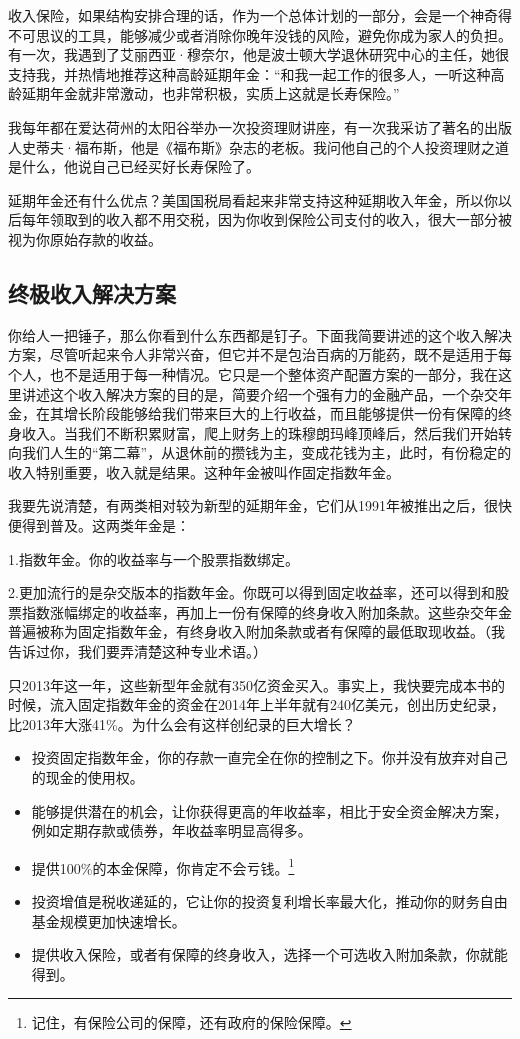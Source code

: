 收入保险，如果结构安排合理的话，作为一个总体计划的一部分，会是一个神奇得不可思议的工具，能够减少或者消除你晚年没钱的风险，避免你成为家人的负担。有一次，我遇到了艾丽西亚·穆奈尔，他是波士顿大学退休研究中心的主任，她很支持我，并热情地推荐这种高龄延期年金：“和我一起工作的很多人，一听这种高龄延期年金就非常激动，也非常积极，实质上这就是长寿保险。”

我每年都在爱达荷州的太阳谷举办一次投资理财讲座，有一次我采访了著名的出版人史蒂夫·福布斯，他是《福布斯》杂志的老板。我问他自己的个人投资理财之道是什么，他说自己已经买好长寿保险了。

延期年金还有什么优点？美国国税局看起来非常支持这种延期收入年金，所以你以后每年领取到的收入都不用交税，因为你收到保险公司支付的收入，很大一部分被视为你原始存款的收益。

\subsection{终极收入解决方案}

你给人一把锤子，那么你看到什么东西都是钉子。下面我简要讲述的这个收入解决方案，尽管听起来令人非常兴奋，但它并不是包治百病的万能药，既不是适用于每个人，也不是适用于每一种情况。它只是一个整体资产配置方案的一部分，我在这里讲述这个收入解决方案的目的是，简要介绍一个强有力的金融产品，一个杂交年金，在其增长阶段能够给我们带来巨大的上行收益，而且能够提供一份有保障的终身收入。当我们不断积累财富，爬上财务上的珠穆朗玛峰顶峰后，然后我们开始转向我们人生的“第二幕”，从退休前的攒钱为主，变成花钱为主，此时，有份稳定的收入特别重要，收入就是结果。这种年金被叫作固定指数年金。

我要先说清楚，有两类相对较为新型的延期年金，它们从1991年被推出之后，很快便得到普及。这两类年金是：

1.指数年金。你的收益率与一个股票指数绑定。

2.更加流行的是杂交版本的指数年金。你既可以得到固定收益率，还可以得到和股票指数涨幅绑定的收益率，再加上一份有保障的终身收入附加条款。这些杂交年金普遍被称为固定指数年金，有终身收入附加条款或者有保障的最低取现收益。（我告诉过你，我们要弄清楚这种专业术语。）

只2013年这一年，这些新型年金就有350亿资金买入。事实上，我快要完成本书的时候，流入固定指数年金的资金在2014年上半年就有240亿美元，创出历史纪录，比2013年大涨41\%。为什么会有这样创纪录的巨大增长？

\begin{itemize}
\item 投资固定指数年金，你的存款一直完全在你的控制之下。你并没有放弃对自己的现金的使用权。
\item 能够提供潜在的机会，让你获得更高的年收益率，相比于安全资金解决方案，例如定期存款或债券，年收益率明显高得多。
\item 提供100\%的本金保障，你肯定不会亏钱。\footnote{\label{fn:pdf-29-3}记住，有保险公司的保障，还有政府的保险保障。}
\item 投资增值是税收递延的，它让你的投资复利增长率最大化，推动你的财务自由基金规模更加快速增长。
\item 提供收入保险，或者有保障的终身收入，选择一个可选收入附加条款，你就能得到。
\end{itemize}


